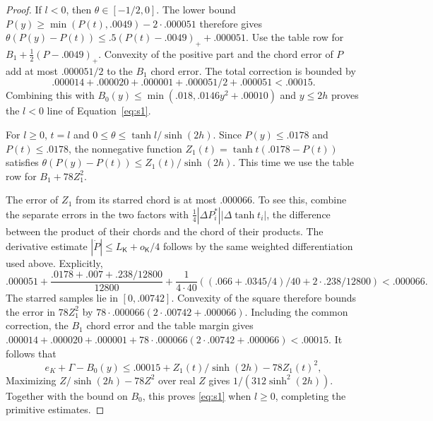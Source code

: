 \begin{proof}
If $l<0$, then $\theta\in[-1/2,0]$.
The lower bound
$P(y)\ge\min(P(t),.0049)-2\cdot.000051$ therefore gives
$\theta(P(y)-P(t))\le.5(P(t)-.0049)_++ .000051$.
Use the table row for $B_1+\tfrac12(P-.0049)_+$.
Convexity of the positive part and the chord error of $P$ add at
most $.000051/2$ to the $B_1$ chord error. The total correction is
bounded by
\[
 .000014+.000020+.000001+.000051/2+.000051<.00015.
\]
Combining this with $B_0(y)\le\min(.018,.0146y^2+.00010)$ and
$y\le2h$ proves the $l<0$ line of Equation~\eqref{eq:s1}.

For $l\ge0$, $t=l$ and
$0\le\theta\le\tanh l/\sinh(2h)$.
Since $P(y)\le.0178$ and $P(t)\le.0178$, the nonnegative function
$Z_1(t)=\tanh t(.0178-P(t))$ satisfies
$\theta(P(y)-P(t))\le Z_1(t)/\sinh(2h)$.
This time we use the table row for $B_1+78Z_1^2$.

The error of $Z_1$ from its starred chord is at most $.000066$.
To see this, combine the separate errors in the two factors with
$\tfrac14|\Delta P_i^*||\Delta\tanh t_i|$, the difference between
the product of their chords and the chord of their products.
The derivative estimate $|\dot P|\le L_{\mathsf K}+o_{\mathsf K}/4$
follows by the same weighted differentiation used above. Explicitly,
\[
 .000051+\frac{.0178+.007+.238/12800}{12800}
 +\frac1{4\cdot40}\left((.066+.0345/4)/40+2\cdot.238/12800\right)<.000066 .
\]
The starred samples lie in $[0,.00742]$. Convexity of the square
therefore bounds the error in $78Z_1^2$ by
$78\cdot.000066(2\cdot.00742+.000066)$.
Including the common correction, the $B_1$ chord error and the table
margin gives
$ .000014+.000020+.000001+
78\cdot.000066(2\cdot.00742+.000066)<.00015$.
It follows that
\[
 e_K+\Gamma-B_0(y)\le .00015+Z_1(t)/\sinh(2h)-78 Z_1(t)^2 ,
\]
Maximizing $Z/\sinh(2h)-78Z^2$ over real $Z$ gives
$1/(312\sinh^2(2h))$. Together with the bound on $B_0$, this proves
\eqref{eq:s1} when $l\ge0$, completing the primitive estimates.


\end{proof}
